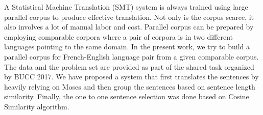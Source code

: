 A Statistical Machine Translation (SMT) system is always trained using large parallel corpus to produce effective translation. Not only is the corpus scarce, it also involves a lot of manual labor and cost. Parallel corpus can be prepared by employing comparable corpora where a pair of corpora is in two different languages pointing to the same domain. In the present work, we try to build a parallel corpus for French-English language pair from a given comparable corpus. The data and the problem set are provided as part of the shared task organized by BUCC 2017. We have proposed a system that first translates the sentences by heavily relying on Moses and then group the sentences based on sentence length similarity. Finally, the one to one sentence selection was done based on Cosine Similarity algorithm.
